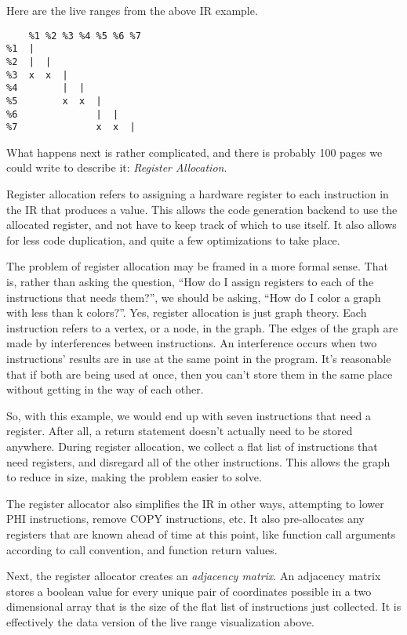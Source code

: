 \documentclass[
12pt,
letterpaper,
oneside,
]{memoir}
\begin{document}
Here are the live ranges from the above IR example.

\begin{verbatim}
    %1 %2 %3 %4 %5 %6 %7
%1  |
%2  |  |
%3  x  x  |
%4        |  |
%5        x  x  |
%6              |  |
%7              x  x  |
\end{verbatim}

\filbreak

What happens next is rather complicated, and there is probably 100 pages we could write to describe it: \emph{Register Allocation}.

Register allocation refers to assigning a hardware register to each instruction in the IR that produces a value. This allows the code generation backend to use the allocated register, and not have to keep track of which to use itself. It also allows for less code duplication, and quite a few optimizations to take place.

The problem of register allocation may be framed in a more formal sense. That is, rather than asking the question, ``How do I assign registers to each of the instructions that needs them?'', we should be asking, ``How do I color a graph with less than k colors?''. Yes, register allocation is just graph theory. Each instruction refers to a vertex, or a node, in the graph. The edges of the graph are made by interferences between instructions. An interference occurs when two instructions' results are in use at the same point in the program. It's reasonable that if both are being used at once, then you can't store them in the same place without getting in the way of each other.

So, with this example, we would end up with seven instructions that need a register. After all, a return statement doesn't actually need to be stored anywhere. During register allocation, we collect a flat list of instructions that need registers, and disregard all of the other instructions. This allows the graph to reduce in size, making the problem easier to solve.

\filbreak

The register allocator also simplifies the IR in other ways, attempting to lower PHI instructions, remove COPY instructions, etc. It also pre-allocates any registers that are known ahead of time at this point, like function call arguments according to call convention, and function return values.

Next, the register allocator creates an \emph{adjacency matrix}. An adjacency matrix stores a boolean value for every unique pair of coordinates possible in a two dimensional array that is the size of the flat list of instructions just collected. It is effectively the data version of the live range visualization above.
\end{document}
